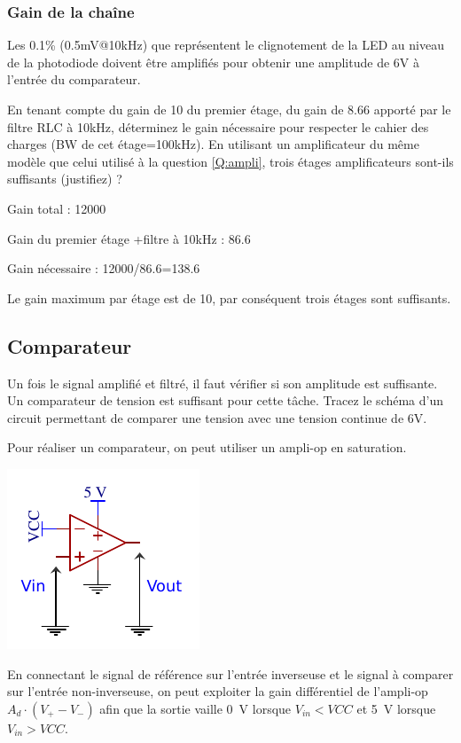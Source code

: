 \documentclass{../template/tp}
\begin{document}
 \subsubsection{Gain de la chaîne}

 Les 0.1\% (0.5mV@10kHz) que représentent le clignotement de la LED au niveau de la photodiode doivent être amplifiés pour obtenir une amplitude de 6V à l'entrée du comparateur.

 \Question
 {
 En tenant compte du gain de 10 du premier étage, du gain de 8.66 apporté par le filtre RLC à 10kHz, déterminez le gain nécessaire pour respecter le cahier des charges (BW de cet étage=100kHz). En utilisant un amplificateur du même modèle que celui utilisé à la question \ref{Q:ampli}, trois étages amplificateurs sont-ils suffisants (justifiez) ?

 }
 {%
 Gain total : 12000

 Gain du premier étage +filtre à 10kHz : 86.6

 Gain nécessaire : 12000/86.6=138.6

 Le gain maximum par étage est de 10, par conséquent trois étages sont suffisants.
 }

\subsection{Comparateur}
Un fois le signal amplifié et filtré, il faut vérifier si son amplitude est suffisante. Un comparateur de tension est suffisant pour cette tâche.
\Question
{
Tracez le schéma d'un circuit permettant de comparer une tension avec une tension continue de 6V.
}
{%
Pour réaliser un comparateur, on peut utiliser un ampli-op en saturation.

\begin{center}
	\includegraphics[scale=1.4]{comparateur.pdf}
\end{center}

En connectant le signal de référence sur l'entrée inverseuse et le signal à comparer sur l'entrée non-inverseuse, on peut exploiter la gain différentiel de l'ampli-op $A_d \cdot (V_+ - V_-)$ afin que la sortie vaille 0~V lorsque $V_{in} < VCC$ et 5~V lorsque $V_{in} > VCC$.
}
%
\end{document}
